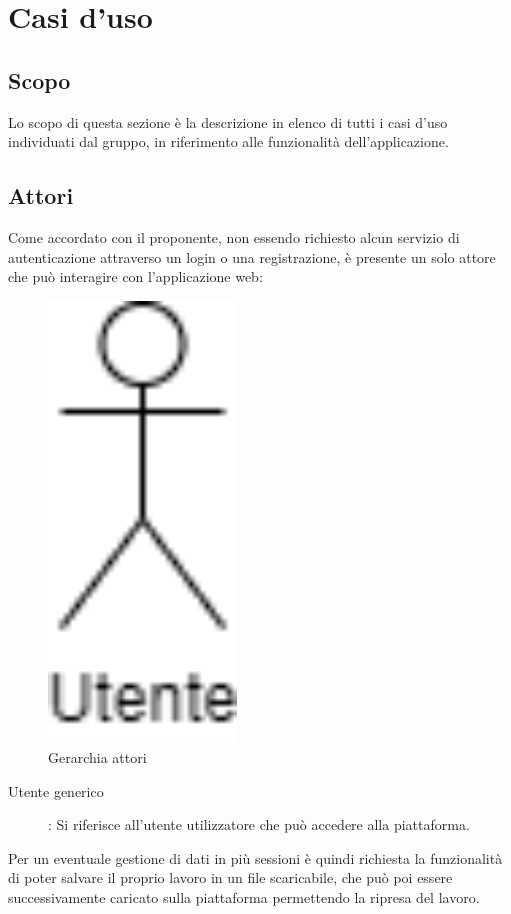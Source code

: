 \section{Casi d'uso}
\subsection{Scopo}
Lo scopo di questa sezione è la descrizione in elenco di tutti i casi d'uso individuati dal gruppo, in riferimento alle funzionalità dell'applicazione.
\subsection{Attori}
Come accordato con il proponente, non essendo richiesto alcun servizio di autenticazione attraverso un login o una registrazione, è presente un solo attore che può interagire con l'applicazione web:

\begin{figure}[h]
\includegraphics[width=5cm]{Section/Images/Utente.png}
\centering
\caption{Gerarchia attori}
\end{figure}

\begin{description}
\item[Utente generico]:
Si riferisce all'utente utilizzatore che può accedere alla piattaforma.
\end{description}
Per un eventuale gestione di dati in più sessioni è quindi richiesta la funzionalità di poter salvare il proprio lavoro in un file scaricabile, che può poi essere successivamente caricato sulla piattaforma permettendo la ripresa del lavoro.
